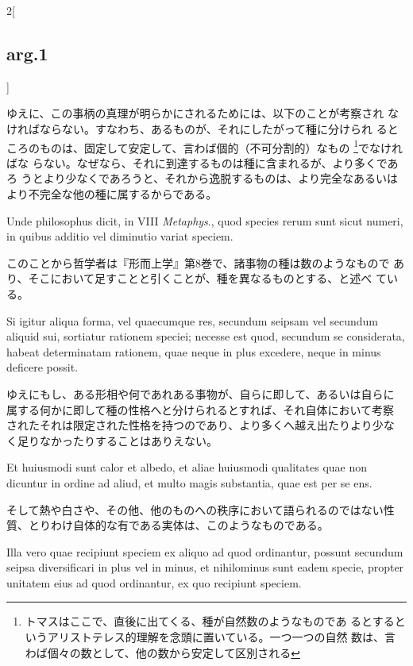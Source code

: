 \documentclass[paper=a4paper,fontsize=10pt,jafontsize=9pt,titlepage]{jlreq}
\begin{document}
\begin{paracol}{2}[\subsection{arg.1}]
\switchcolumn

ゆえに、この事柄の真理が明らかにされるためには、以下のことが考察され
 なければならない。すなわち、あるものが、それにしたがって種に分けられ
 るところのものは、固定して安定して、言わば個的（不可分割的）なもの
 \footnote{トマスはここで、直後に出てくる、種が自然数のようなものであ
 るとするというアリストテレス的理解を念頭に置いている。一つ一つの自然
 数は、言わば個々の数として、他の数から安定して区別される}でなければな
 らない。なぜなら、それに到達するものは種に含まれるが、より多くであろ
 うとより少なくであろうと、それから逸脱するものは、より完全なあるいは
 より不完全な他の種に属するからである。

\switchcolumn*

Unde philosophus dicit, in VIII
{\itshape Metaphys}., quod species rerum sunt sicut numeri, in quibus additio vel
diminutio variat speciem.

\switchcolumn

このことから哲学者は『形而上学』第8巻で、諸事物の種は数のようなもので
 あり、そこにおいて足すことと引くことが、種を異なるものとする、と述べ
 ている。

\switchcolumn*

Si igitur aliqua forma, vel quaecumque res,
secundum seipsam vel secundum aliquid sui, sortiatur rationem speciei;
necesse est quod, secundum se considerata, habeat determinatam
rationem, quae neque in plus excedere, neque in minus deficere
possit.

\switchcolumn

ゆえにもし、ある形相や何であれある事物が、自らに即して、あるいは自らに
属する何かに即して種の性格へと分けられるとすれば、それ自体において考察
されたそれは限定された性格を持つのであり、より多くへ越え出たりより少な
く足りなかったりすることはありえない。

\switchcolumn*

Et huiusmodi sunt calor et albedo, et aliae huiusmodi
qualitates quae non dicuntur in ordine ad aliud, et multo magis
substantia, quae est per se ens.

\switchcolumn

そして熱や白さや、その他、他のものへの秩序において語られるのではない性
質、とりわけ自体的な有である実体は、このようなものである。

\switchcolumn*

Illa vero quae recipiunt speciem ex
aliquo ad quod ordinantur, possunt secundum seipsa diversificari in
plus vel in minus, et nihilominus sunt eadem specie, propter unitatem
eius ad quod ordinantur, ex quo recipiunt speciem.


\end{paracol}
\end{document}
